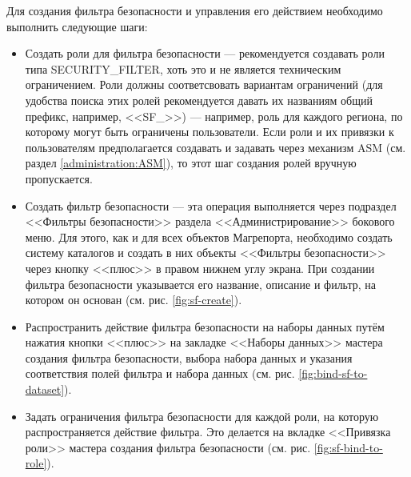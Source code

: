 \documentclass[../user-manual.tex]{subfiles}
\begin{document}
	Для создания фильтра безопасности и управления его действием необходимо выполнить следующие шаги:
	
	\begin{itemize}
		
		\item Создать роли для фильтра безопасности --- рекомендуется создавать роли типа SECURITY\_FILTER, хоть это и не является техническим ограничением. Роли должны соответсвовать вариантам ограничений (для удобства поиска этих ролей рекомендуется давать их названиям общий префикс, например, <<SF\_>>) --- например, роль для каждого региона, по которому могут быть ограничены пользователи. Если роли и их привязки к пользователям предполагается создавать и задавать через механизм ASM (см. раздел \ref{administration:ASM}), то этот шаг создания ролей вручную пропускается.
		
		\item Создать фильтр безопасности --- эта операция выполняется через подраздел <<Фильтры безопасности>> раздела <<Администрирование>> бокового меню. Для этого, как и для всех объектов Магрепорта, необходимо создать систему каталогов и создать в них объекты <<Фильтры безопасности>> через кнопку <<плюс>> в правом нижнем углу экрана. При создании фильтра безопасности указывается его название, описание и фильтр, на котором он основан (см. рис. \ref{fig:sf-create}).
		
		\item Распространить действие фильтра безопасности на наборы данных путём нажатия кнопки <<плюс>> на закладке <<Наборы данных>> мастера создания фильтра безопасности, выбора набора данных и указания соответствия полей фильтра и набора данных (см. рис. \ref{fig:bind-sf-to-dataset}).
		
		\item Задать ограничения фильтра безопасности для каждой роли, на которую распространяется действие фильтра. Это делается на вкладке <<Привязка роли>> мастера создания фильтра безопасности (см. рис. \ref{fig:sf-bind-to-role}).
		
	\end{itemize}
\end{document}
